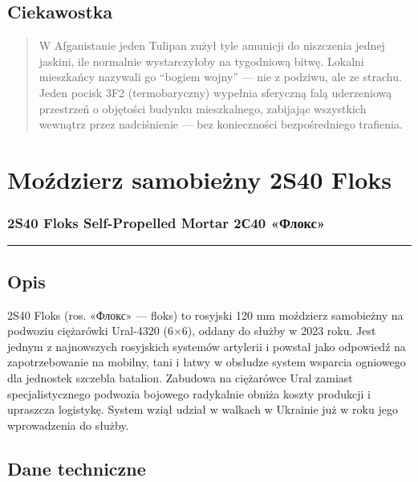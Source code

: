 \documentclass[12pt,oneside]{book}
\begin{document}
\subsection{Ciekawostka}\label{ciekawostka-24}

\begin{quote}
W Afganistanie jeden Tulipan zużył tyle amunicji do niszczenia jednej
jaskini, ile normalnie wystarczyłoby na tygodniową bitwę. Lokalni
mieszkańcy nazywali go ``bogiem wojny'' --- nie z podziwu, ale ze
strachu. Jeden pocisk 3F2 (termobaryczny) wypełnia sferyczną falą
uderzeniową przestrzeń o objętości budynku mieszkalnego, zabijając
wszystkich wewnątrz przez nadciśnienie --- bez konieczności
bezpośredniego trafienia.
\end{quote}

\section{Moździerz samobieżny 2S40
Floks}\label{moux17adzierz-samobieux17cny-2s40-floks}

\subsubsection{2S40 Floks Self-Propelled Mortar \textbar{} 2С40
«Флокс»}\label{s40-floks-self-propelled-mortar-2ux44140-ux444ux43bux43eux43aux441}

\begin{center}\rule{0.5\linewidth}{0.5pt}\end{center}

\subsection{Opis}\label{opis-25}

2S40 Floks (ros. «Флокс» --- floks) to rosyjski 120 mm moździerz
samobieżny na podwoziu ciężarówki Ural-4320 (6×6), oddany do służby w
2023 roku. Jest jednym z najnowszych rosyjskich systemów artylerii i
powstał jako odpowiedź na zapotrzebowanie na mobilny, tani i łatwy w
obsłudze system wsparcia ogniowego dla jednostek szczebla batalion.
Zabudowa na ciężarówce Ural zamiast specjalistycznego podwozia bojowego
radykalnie obniża koszty produkcji i upraszcza logistykę. System wziął
udział w walkach w Ukrainie już w roku jego wprowadzenia do służby.

\subsection{Dane techniczne}\label{dane-techniczne-25}
\end{document}
